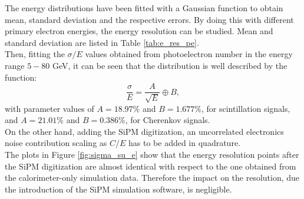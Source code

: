 The energy distributions have been fitted with a Gaussian function to obtain mean, standard deviation and the respective errors. By doing this with different primary electron energies, the energy resolution can be studied. Mean and standard deviation are listed in Table \ref{tab:e_res_pe}.\\
Then, fitting the $\sigma/E$ values obtained from photoelectron number in the energy range $5-80$ GeV, it can be seen that the distribution is well described by the function:
\begin{equation}\label{eq:resolution}
	\frac{\sigma}{E} = \frac{A}{\sqrt{E}} \oplus B,
\end{equation} 
with parameter values of $A = 18.97\%$ and $B = 1.677\%$, for scintillation signals, and $A = 21.01\%$ and $B = 0.386\%$, for Cherenkov signals.\\
On the other hand, adding the SiPM digitization, an uncorrelated electronics noise contribution scaling as $C/E$ has to be added in quadrature.\\
The plots in Figure \ref{fig:sigma_su_e} show that the energy resolution points after the SiPM digitization are almost identical with respect to the one obtained from the calorimeter-only simulation data. Therefore the impact on the resolution, due the introduction of the SiPM simulation software, is negligible.

